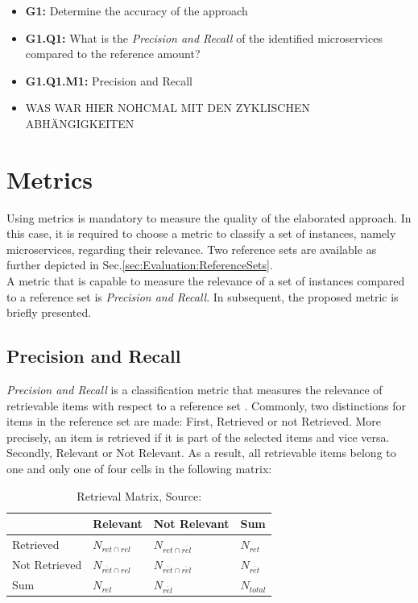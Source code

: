 \begin{itemize}
	\item \textbf{G1:} Determine the accuracy of the approach
	\item \textbf{G1.Q1:} What is the \textit{Precision and Recall} of the identified microservices compared to the reference amount?
	\item \textbf{G1.Q1.M1:}  Precision and Recall
	\item WAS WAR HIER NOHCMAL MIT DEN ZYKLISCHEN ABHÄNGIGKEITEN
\end{itemize}




\section{Metrics}
\label{sec:Evaluation:Metrics}
Using metrics is mandatory to measure the quality of the elaborated approach. In this case, it is required to choose a metric to classify a set of instances, namely microservices, regarding their relevance. Two reference sets are available as further depicted in Sec.\ref{sec:Evaluation:ReferenceSets}. \\
A metric that is capable to measure the relevance of a set of instances compared to a reference set is \textit{Precision and Recall}. In subsequent, the proposed metric is briefly presented.

\subsection{Precision and Recall}
\label{sec:Evaluation:Metrics:sPrecRecall}
\textit{Precision and Recall} is a classification metric that measures the relevance of retrievable items with respect to a reference set \cite{PrecisionRecall}. Commonly, two distinctions for items in the reference set are made: First, Retrieved or not Retrieved. More precisely, an item is retrieved if it is part of the selected items and vice versa. Secondly, Relevant or Not Relevant. As a result, all retrievable items belong to one and only one of four cells in the following matrix:


\begin{table}[!h]
	\centering
	\begin{tabular}{|l||l|l|l|}
		\hline
		& Relevant & Not Relevant & Sum \\ \hline
		Retrieved     &     $N_{ret\cap rel}$     &     $N_{ret\cap \overline{rel}}$            &     $N_{ret}$  \\ \hline
		Not Retrieved &      $N_{\overline{ret}\cap rel}$      &      $N_{\overline{ret}\cap \overline{rel}}$          &    $N_{\overline{ret}}$   \\\hline
		Sum           &         $N_{rel}$   &      $N_{\overline{rel}}$          &    $N_{total}$   \\ \hline
		
	\end{tabular}
\caption{Retrieval Matrix, Source: \cite{PrecisionRecall}}
    \label{tab:PrecRecall}
    
\end{table}


